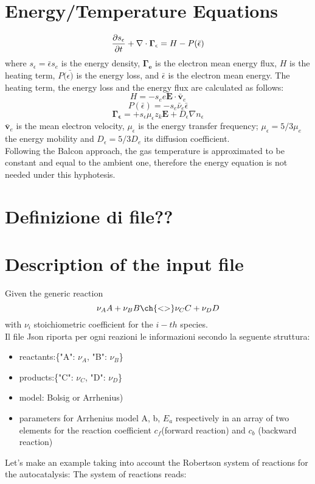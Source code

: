 \documentclass[11pt]{amsart}
\begin{document}
\section{Energy/Temperature Equations}
$$
\frac{\partial s_\epsilon}{\partial t} + \nabla\cdot{\mathbf{{\Gamma_\epsilon}}} = H - P(\bar{\epsilon})
$$
where $s_\epsilon = \bar{\epsilon} s_e$ is the energy density, $\mathbf{\Gamma_e}$ is the electron mean energy flux, $H$ is the heating term, $P(\bar{\epsilon)}$ is the energy loss, and $\bar{\epsilon}$ is the electron mean energy.
The heating term, the energy loss and the energy flux are calculated as follows:
$$
H=-s_e e \mathbf{E} \cdot  \mathbf{\bar{v}}_e
$$ 
$$
P(\bar{\epsilon})=-s_e\bar{\nu}_e\bar{\epsilon}
$$
$$
\mathbf{\Gamma_\epsilon}= +s_\epsilon \mu_\epsilon z_k \mathbf{E} + D_\epsilon\nabla n_\epsilon
$$    
$\mathbf{\bar{v}}_e$ is the mean electron velocity, $\mu_\epsilon$ is the energy transfer frequency;
$\mu_\epsilon = 5/3\mu_e$ the energy mobility and $D_\epsilon = 5/3 D_e$ its diffusion coefficient.\\
Following the Balcon approach, the gas temperature is approximated to be constant and equal to the ambient one, therefore the energy equation is not needed under this hyphotesis.

\section{Definizione di file??}
\section{Description of the input file}
Given the generic reaction
$$
\nu_A A + \nu_B B \ch{<>} \nu_C C + \nu_D D    
$$
with $\nu_i$ stoichiometric coefficient for the $i-th$ species.\\
Il file Json riporta per ogni reazioni le informazioni secondo la seguente struttura:
\begin{itemize}
    \item reactants:\{"A": $\nu_A$, "B": $\nu_B$\}
    \item products:\{"C": $\nu_C$, "D": $\nu_D$\}
    \item model: Bolsig or Arrhenius)
    \item parameters for Arrhenius model A, b, $E_{a}$ respectively in an array of two elements for the reaction coefficient $c_{f}$(forward reaction) and  $c_{b}$ (backward reaction)
\end{itemize}

Let's make an example taking into account the Robertson system of reactions for the autocatalysis:
The system of reactions reads:
\end{document}
